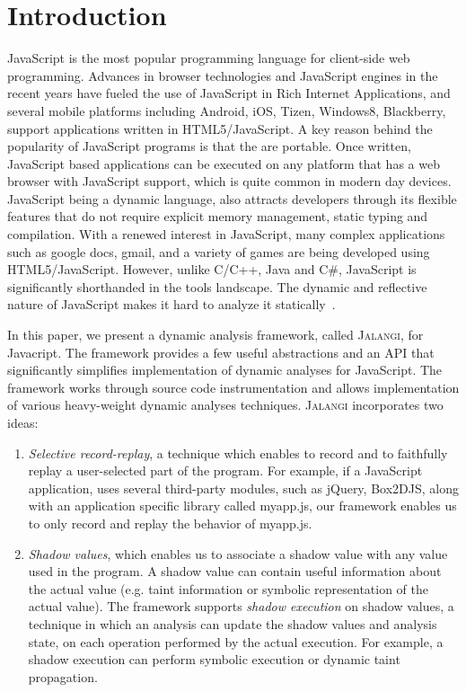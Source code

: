 \documentclass{sig-alternate}
\def\jalangi{\textsc{Jalangi}}
\begin{document}
\section{Introduction}

JavaScript is the most popular programming language for client-side
web programming. Advances in browser technologies and JavaScript
engines in the recent years have fueled the use of JavaScript in Rich
Internet Applications, and several mobile platforms including Android,
iOS, Tizen, Windows8, Blackberry, support applications written in
HTML5/JavaScript. A key reason behind the popularity of JavaScript
programs is that the are portable. Once written, JavaScript based
applications can be executed on any platform that has a web browser
with JavaScript support, which is quite common in modern day devices.
JavaScript being a dynamic language, also attracts developers through
its flexible features that do not require explicit memory management,
static typing and compilation.  With a renewed interest in JavaScript,
many complex applications such as google docs, gmail, and a variety of
games are being developed using HTML5/JavaScript. However, unlike
C/C++, Java and C\#, JavaScript is significantly shorthanded in the
tools landscape. The dynamic and reflective nature of JavaScript makes
it hard to analyze it
statically~\cite{Richards:2010:ADB:1806596.1806598,Wei:2012:BAJ:2384716.2384758,Ratanaworabhan:2010:JCB:1863166.1863169}.

In this paper, we present a dynamic analysis framework, called
\jalangi{}, for Javacript.  The framework provides a few useful
abstractions and an API that significantly simplifies implementation
of dynamic analyses for JavaScript.  The framework works through
source code instrumentation and allows implementation of various
heavy-weight dynamic analyses techniques.  \jalangi{} incorporates two
ideas:

\begin{enumerate}
\item \emph{Selective record-replay}, a technique which enables to record and
  to faithfully replay a user-selected part of the program.  For
  example, if a JavaScript application, uses several third-party
  modules, such as jQuery, Box2DJS, along with an application specific
  library called myapp.js, our framework enables us to only record and
  replay the behavior of myapp.js.
\item\emph{ Shadow values}, which enables us to associate a shadow
  value with any value used in the program.  A shadow value can
  contain useful information about the actual value (e.g. taint
  information or symbolic representation of the actual value).  The
  framework supports \emph{shadow execution} on shadow values, a
  technique in which an analysis can update the shadow values and
  analysis state, on each operation performed by the actual execution.
  For example, a shadow execution can perform symbolic execution or
  dynamic taint propagation.
\end{enumerate}
\end{document}
